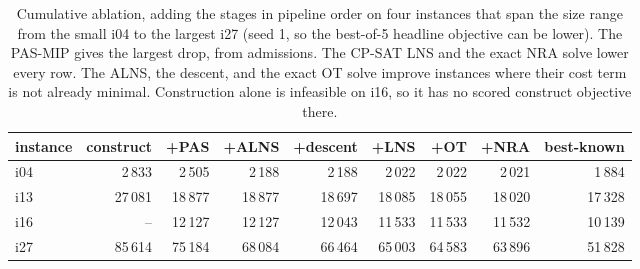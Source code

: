 \begin{table}[!ht]
\caption{Cumulative ablation, adding the stages in pipeline order on four instances that span the size range from the small i04 to the largest i27 (seed 1, so the best-of-5 headline objective can be lower). The PAS-MIP gives the largest drop, from admissions. The CP-SAT LNS and the exact NRA solve lower every row. The ALNS, the descent, and the exact OT solve improve instances where their cost term is not already minimal. Construction alone is infeasible on i16, so it has no scored construct objective there.}\label{tab:abl}
\centering\small
\begin{tabular}{lrrrrrrrr}
\toprule
instance & construct & +PAS & +ALNS & +descent & +LNS & +OT & +NRA & best-known\\
\midrule
i04 & 2\,833 & 2\,505 & 2\,188 & 2\,188 & 2\,022 & 2\,022 & 2\,021 & 1\,884\\
i13 & 27\,081 & 18\,877 & 18\,877 & 18\,697 & 18\,085 & 18\,055 & 18\,020 & 17\,328\\
i16 & -- & 12\,127 & 12\,127 & 12\,043 & 11\,533 & 11\,533 & 11\,532 & 10\,139\\
i27 & 85\,614 & 75\,184 & 68\,084 & 66\,464 & 65\,003 & 64\,583 & 63\,896 & 51\,828\\
\bottomrule
\end{tabular}
\end{table}